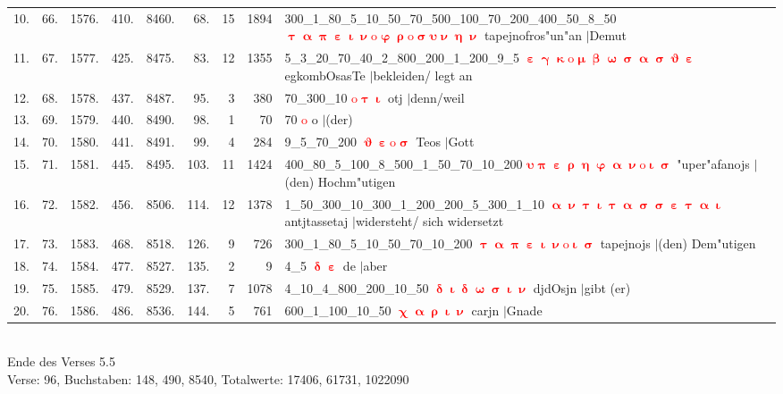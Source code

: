 \documentclass[a4paper,10pt,landscape]{article}
\begin{document}
\begin{tabular}{rrrrrrrrp{120mm}}
10.&66.&1576.&410.&8460.&68.&15&1894&300\_1\_80\_5\_10\_50\_70\_500\_100\_70\_200\_400\_50\_8\_50 \textcolor{red}{$\boldsymbol{\uptau\upalpha\uppi\upepsilon\upiota\upnu\mathrm{o}\upvarphi\uprho\mathrm{o}\upsigma\upsilon\upnu\upeta\upnu}$} tapejnofros"un"an $|$Demut\\
11.&67.&1577.&425.&8475.&83.&12&1355&5\_3\_20\_70\_40\_2\_800\_200\_1\_200\_9\_5 \textcolor{red}{$\boldsymbol{\upepsilon\upgamma\upkappa\mathrm{o}\upmu\upbeta\upomega\upsigma\upalpha\upsigma\upvartheta\upepsilon}$} egkombOsasTe $|$bekleiden/ legt an\\
12.&68.&1578.&437.&8487.&95.&3&380&70\_300\_10 \textcolor{red}{$\boldsymbol{\mathrm{o}\uptau\upiota}$} otj $|$denn/weil\\
13.&69.&1579.&440.&8490.&98.&1&70&70 \textcolor{red}{$\boldsymbol{\mathrm{o}}$} o $|$(der)\\
14.&70.&1580.&441.&8491.&99.&4&284&9\_5\_70\_200 \textcolor{red}{$\boldsymbol{\upvartheta\upepsilon\mathrm{o}\upsigma}$} Teos $|$Gott\\
15.&71.&1581.&445.&8495.&103.&11&1424&400\_80\_5\_100\_8\_500\_1\_50\_70\_10\_200 \textcolor{red}{$\boldsymbol{\upsilon\uppi\upepsilon\uprho\upeta\upvarphi\upalpha\upnu\mathrm{o}\upiota\upsigma}$} "uper"afanojs $|$(den) Hochm"utigen\\
16.&72.&1582.&456.&8506.&114.&12&1378&1\_50\_300\_10\_300\_1\_200\_200\_5\_300\_1\_10 \textcolor{red}{$\boldsymbol{\upalpha\upnu\uptau\upiota\uptau\upalpha\upsigma\upsigma\upepsilon\uptau\upalpha\upiota}$} antjtassetaj $|$widersteht/ sich widersetzt\\
17.&73.&1583.&468.&8518.&126.&9&726&300\_1\_80\_5\_10\_50\_70\_10\_200 \textcolor{red}{$\boldsymbol{\uptau\upalpha\uppi\upepsilon\upiota\upnu\mathrm{o}\upiota\upsigma}$} tapejnojs $|$(den) Dem"utigen\\
18.&74.&1584.&477.&8527.&135.&2&9&4\_5 \textcolor{red}{$\boldsymbol{\updelta\upepsilon}$} de $|$aber\\
19.&75.&1585.&479.&8529.&137.&7&1078&4\_10\_4\_800\_200\_10\_50 \textcolor{red}{$\boldsymbol{\updelta\upiota\updelta\upomega\upsigma\upiota\upnu}$} djdOsjn $|$gibt (er)\\
20.&76.&1586.&486.&8536.&144.&5&761&600\_1\_100\_10\_50 \textcolor{red}{$\boldsymbol{\upchi\upalpha\uprho\upiota\upnu}$} carjn $|$Gnade\\
\end{tabular}\medskip \\
Ende des Verses 5.5\\
Verse: 96, Buchstaben: 148, 490, 8540, Totalwerte: 17406, 61731, 1022090\\
\end{document}
